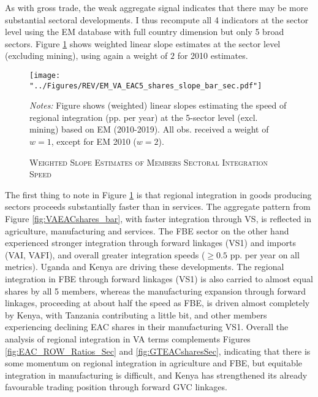 \documentclass[a4paper]{article}
\begin{document}
As with gross trade, the weak aggregate signal indicates that there may be more substantial sectoral developments. I thus recompute all 4 indicators at the sector level using the EM database with full country dimension but only 5 broad sectors. Figure \ref{fig:VAEACshares_bar_sec} shows weighted linear slope estimates at the sector level (excluding mining), using again a weight of $2$ for 2010 estimates. 
%
\begin{figure}[h!] \vspace{-2mm}
\centering
\caption{\label{fig:VAEACshares_bar_sec}\textsc{Weighted Slope Estimates of Members Sectoral Integration Speed}}
\texttt{[image: "../Figures/REV/EM\_VA\_EAC5\_shares\_slope\_bar\_sec.pdf"]} \\ %
\raggedright
\scriptsize
\emph{Notes:} Figure shows (weighted) linear slopes estimating the speed of regional integration (pp. per year) at the 5-sector level (excl. mining) based on EM (2010-2019). All obs. received a weight of $w=1$, except for EM 2010 ($w=2$).  
\vspace{-5mm}
\end{figure}
\FloatBarrier
%
The first thing to note in Figure \ref{fig:VAEACshares_bar_sec} is that regional integration in goods producing sectors proceeds substantially faster than in services. The aggregate pattern from Figure \ref{fig:VAEACshares_bar}, with faster integration through VS, is reflected in agriculture, manufacturing and services. The FBE sector on the other hand experienced stronger integration through forward linkages (VS1) and imports (VAI, VAFI), and overall greater integration speeds ($\geq 0.5$ pp. per year on all metrics). Uganda and Kenya are driving these developments. The regional integration in FBE through forward linkages (VS1) is also carried to almost equal shares by all 5 members, whereas the manufacturing expansion through forward linkages, proceeding at about half the speed as FBE, is driven almost completely by Kenya, with Tanzania contributing a little bit, and other members experiencing declining EAC shares in their manufacturing VS1. Overall the analysis of regional integration in VA terms complements Figures \ref{fig:EAC_ROW_Ratios_Sec} and \ref{fig:GTEACsharesSec}, indicating that there is some momentum on regional integration in agriculture and FBE, but equitable integration in manufacturing is difficult, and Kenya has strengthened its already favourable trading position through forward GVC linkages. 
\end{document}
